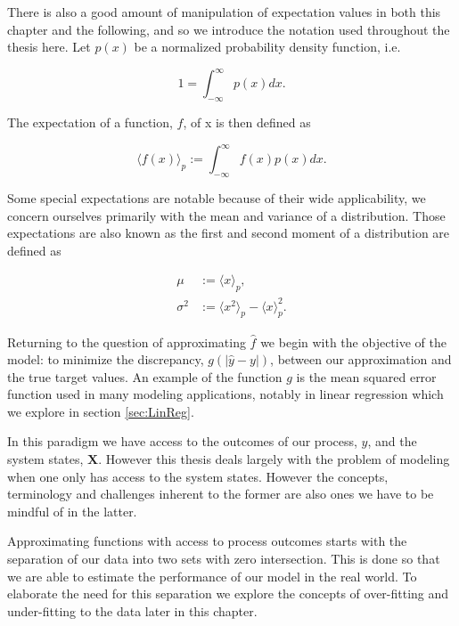There is also a good amount of manipulation of expectation values in both this chapter and the following, and so we introduce the notation used throughout the thesis here. Let $p(x)$ be a normalized probability density function, i.e.

\begin{equation}
1 = \int_{-\infty}^\infty p(x) dx.
\end{equation}

\noindent The expectation of a function, $f$, of x is then defined as 

\begin{equation}\label{eq:expect}
\langle f(x) \rangle_p :=\int_{-\infty}^\infty f(x) p(x) dx.
\end{equation}

\noindent Some special expectations are notable because of their wide applicability, we concern ourselves primarily with the mean and variance of a distribution. Those expectations are also known as the first and second moment of a distribution are defined as

\begin{align}
\mu &:= \langle x \rangle_p, \\
\sigma^2 &:= \langle x^2 \rangle_p  - \langle x\rangle_p^2.
\end{align}

\noindent Returning to the question of approximating $\hat{f}$ we begin with the objective of the model: to minimize the discrepancy, $g(|\hat{y} - y|)$, between our approximation and the true target values. An  example of the function $g$ is the mean squared error function used in many modeling applications, notably in linear regression which we explore in section \ref{sec:LinReg}.

In this paradigm we have access to the outcomes of our process, $\hat{y}$, and the system states, $\mathbf{X}$. However this thesis deals largely with the problem of modeling when one only has access to the system states.  However the concepts, terminology and challenges inherent to the former are also ones we have to be mindful of in the latter.

Approximating functions with access to process outcomes starts with the separation of our data into two sets with zero intersection. This is done so that we are able to estimate the performance of our model in the real world. To elaborate the need for this separation we explore the concepts of over-fitting and under-fitting to the data later in this chapter.